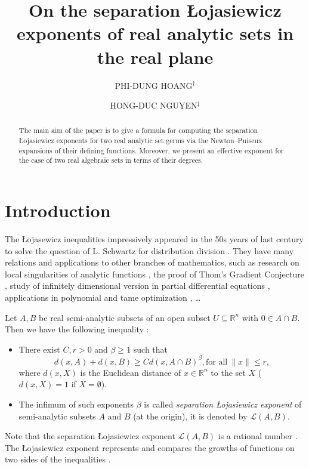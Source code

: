 \documentclass[reqno, 12pt ,a4letter]{amsart}
\title{On the separation \L ojasiewicz exponents of real analytic sets in the real plane}
\author{PHI-D{U}NG HO{A}NG$^\dag$}
\author{HONG-DUC NGUYEN$^\ddag$}
\theoremstyle{definition}
\begin{document}
\maketitle

\begin{abstract}
The main aim of the paper is to give a formula for computing the separation \L ojasiewicz exponents for two real analytic set germs via the Newton--Puiseux expansions of their defining functions. Moreover, we present an effective exponent for the case of two real algebraic sets in terms of their degrees.
\end{abstract}

\section{Introduction}
The \L ojasewicz inequalities impressively appeared in the 50s years of last century to solve the question of L. Schwartz for distribution division \cite{Hormander1958,Lojasiewicz1959, Lojasiewicz1965}. They have many relations and applications to other branches of mathematics, such as research on local singularities of analytic functions \cite{Teissier1977}, the proof of Thom's Gradient Conjecture \cite{Kurdyka2000-2}, study of infinitely dimensional version in partial differential equations \cite{Colding2015}, applications in polynomial and tame optimization \cite{HaPham2017,Hoang2016}, \ldots 

Let $A, B$ be real semi-analytic subsets of an open subset $U \subseteq \mathbb{R}^n$ with $0 \in A \cap B$. Then we have the following inequality \cite{Lojasiewicz1965}:
\begin{itemize}
	\item There exist $C, r > 0$ and $\beta \ge 1$ such that 
	\begin{equation}\label{separation-inequality}
		d(x, A) + d(x, B) \geq Cd(x, A \cap B)^\beta, \text{for all}\ \|x\| \leq r,
	\end{equation}
    where $d(x, X)$ is the Euclidean distance of $x \in \mathbb{R}^n$ to the set $X$ ($d(x, X) = 1$ if $X = \emptyset$).
	\item The infimum of such exponents $\beta$ is called {\em separation \L ojasiewicz exponent} of semi-analytic subsets $A$ and $B$ (at the origin), it is denoted by $\mathscr{L}(A,B)$.
\end{itemize} 
Note that the separation \L ojasiewicz exponent $\mathscr{L}(A, B)$ is a rational number \cite[Corollary 2]{Bochnak1975}. The \L ojasiewicz exponent represents and compares the growths of functions on two sides of the inequalities \cite{Lojasiewicz1965}.  
\end{document}
